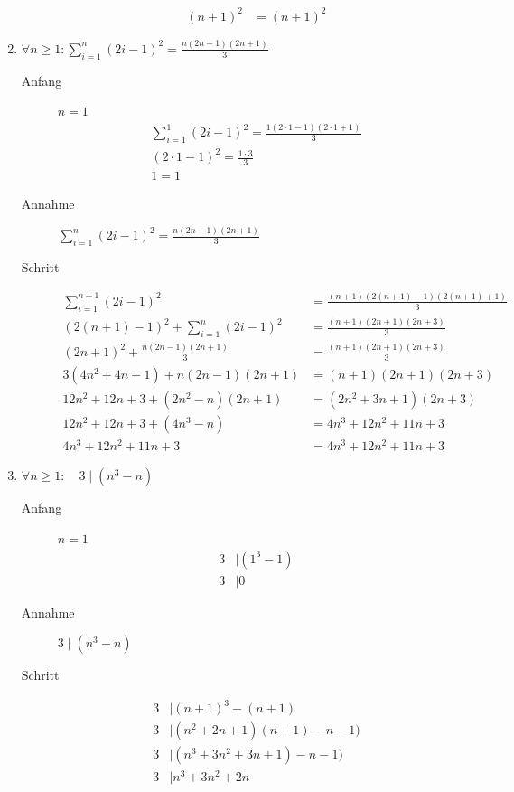 \documentclass[11pt, a4paper]{article}
\begin{document}
\begin{enumerate}
\begin{description}
\begin{align*}
					(n+1)^2 &= (n+1)^2
				\end{align*}
		\end{description}
	\item $\forall n \geq 1 : \sum_{i=1}^n (2i-1)^2 = \frac{n (2n-1)(2n+1)}{3}$
		\begin{description}
			\item[Anfang] $n=1$
				\begin{align*}
					\sum_{i=1}^1 (2i-1)^2 = \frac{1 (2 \cdot 1-1)(2 \cdot 1 +1)}{3} \\
					(2 \cdot 1-1)^2 = \frac{1 \cdot 3}{3} \\
					1 = 1
				\end{align*}
			\item[Annahme] $\sum_{i=1}^n (2i-1)^2 = \frac{n (2n-1)(2n+1)}{3}$
			\item[Schritt] 
				\begin{align*}
					\sum_{i=1}^{n+1} (2i-1)^2 &= \frac{(n+1) (2(n+1)-1)(2(n+1)+1)}{3} \\
					(2(n+1)-1)^2 + \sum_{i=1}^n (2i-1)^2 &= \frac{(n+1)(2n+1)(2n+3)}{3} \\
					(2n+1)^2 + \frac{n(2n-1)(2n+1)}{3} &= \frac{(n+1)(2n+1)(2n+3)}{3} \\
					3(4n^2+4n+1) + n(2n-1)(2n+1) &= (n+1)(2n+1)(2n+3) \\
					12n^2+12n+3 + (2n^2-n)(2n+1) &= (2n^2+3n+1)(2n+3) \\
					12n^2+12n+3 + (4n^3-n) &= 4n^3+12n^2+11n+3 \\
					4n^3+12n^2+11n+3 &= 4n^3+12n^2+11n+3
				\end{align*}
		\end{description}
	\item $\forall n \geq 1 : \quad 3 \mid (n^3 - n)$
		\begin{description}
			\item[Anfang] $n=1$
				\begin{align*}
					3 &\mid (1^3 - 1) \\
					3 &\mid 0
				\end{align*}
			\item[Annahme] $3 \mid (n^3 - n)$
			\item[Schritt] 
			\begin{align*}
				3 &\mid (n+1)^3 - (n+1) \\
				3 &\mid (n^2+2n+1)(n+1) - n-1) \\
				3 &\mid (n^3+3n^2+3n+1) - n-1) \\
				3 &\mid n^3+3n^2+2n \\

\end{align*}
\end{description}
\end{enumerate}
\end{document}
